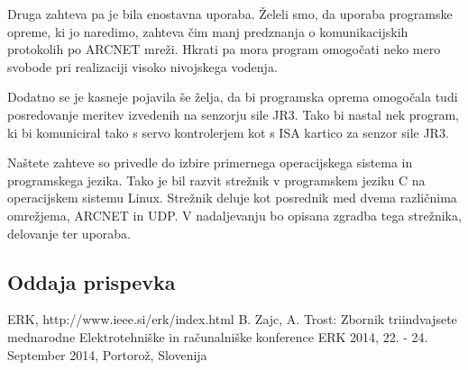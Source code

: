 \documentclass[a4paper]{article}
\begin{document}
Druga zahteva pa je bila enostavna uporaba. Želeli smo, da uporaba programske opreme, ki jo naredimo, zahteva čim manj predznanja o komunikacijskih protokolih po ARCNET mreži. Hkrati pa mora program omogočati neko mero svobode pri realizaciji visoko nivojskega vodenja.

Dodatno se je kasneje pojavila še želja, da bi programska oprema omogočala tudi posredovanje meritev izvedenih na senzorju sile JR3. Tako bi nastal nek program, ki bi komuniciral tako s servo kontrolerjem kot s ISA kartico za senzor sile JR3.

Naštete zahteve so privedle do izbire primernega operacijskega sistema in programskega jezika. Tako je bil razvit strežnik v programskem jeziku C na operacijskem sistemu Linux. Strežnik deluje kot posrednik med dvema različnima omrežjema, ARCNET in UDP.  V nadaljevanju bo opisana zgradba tega strežnika, delovanje ter uporaba.



\subsection{Oddaja prispevka}


\small
\begin{thebibliography}{1}

 ERK, http://www.ieee.si/erk/index.html 
 B. Zajc, A. Trost: Zbornik triindvajsete mednarodne Elektrotehniške in računalniške konference ERK 2014, 22. - 24. September 2014, Portorož, Slovenija

\end{thebibliography}
\end{document}

